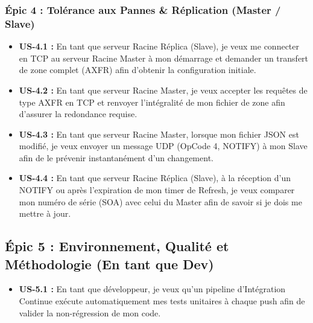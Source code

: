\subsubsection{Épic 4 : Tolérance aux Pannes \& Réplication (Master / Slave)}
\begin{itemize}
    \item \textbf{US-4.1 :} En tant que serveur Racine Réplica (Slave), je veux me connecter en TCP au serveur Racine Master à mon démarrage et demander un transfert de zone complet (AXFR) afin d'obtenir la configuration initiale.
    \item \textbf{US-4.2 :} En tant que serveur Racine Master, je veux accepter les requêtes de type AXFR en TCP et renvoyer l'intégralité de mon fichier de zone afin d'assurer la redondance requise.
    \item \textbf{US-4.3 :} En tant que serveur Racine Master, lorsque mon fichier JSON est modifié, je veux envoyer un message UDP (OpCode 4, NOTIFY) à mon Slave afin de le prévenir instantanément d'un changement.
    \item \textbf{US-4.4 :} En tant que serveur Racine Réplica (Slave), à la réception d'un NOTIFY ou après l'expiration de mon timer de Refresh, je veux comparer mon numéro de série (SOA) avec celui du Master afin de savoir si je dois me mettre à jour.
\end{itemize}

\subsection{Épic 5 : Environnement, Qualité et Méthodologie (En tant que Dev)}
\begin{itemize}
    \item \textbf{US-5.1 :} En tant que développeur, je veux qu'un pipeline d'Intégration Continue exécute automatiquement mes tests unitaires à chaque push afin de valider la non-régression de mon code.
\end{itemize}